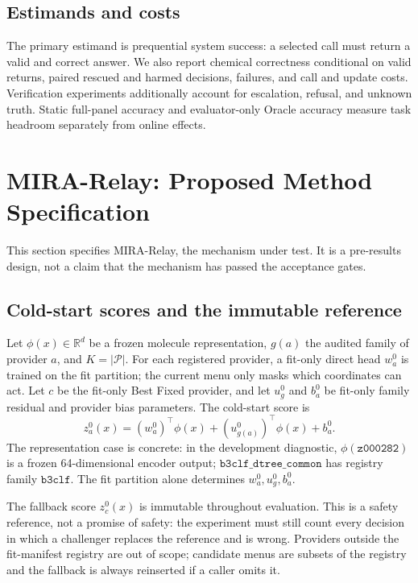 \documentclass[sigconf,anonymous]{aamas}
\begin{document}
\subsection{Estimands and costs}
The primary estimand is prequential system success: a selected call must return a valid and correct answer. We also report chemical correctness conditional on valid returns, paired rescued and harmed decisions, failures, and call and update costs. Verification experiments additionally account for escalation, refusal, and unknown truth. Static full-panel accuracy and evaluator-only Oracle accuracy measure task headroom separately from online effects.

\section{MIRA-Relay: Proposed Method Specification}
This section specifies MIRA-Relay, the mechanism under test. It is a pre-results design, not a claim that the mechanism has passed the acceptance gates.

\subsection{Cold-start scores and the immutable reference}
Let $\phi(x)\in\mathbb{R}^{d}$ be a frozen molecule representation, $g(a)$ the audited family of provider $a$, and $K=|\mathcal P|$. For each registered provider, a fit-only direct head $w_a^0$ is trained on the fit partition; the current menu only masks which coordinates can act. Let $c$ be the fit-only Best Fixed provider, and let $u_g^0$ and $b_a^0$ be fit-only family residual and provider bias parameters. The cold-start score is
$$
z_a^0(x)=(w_a^0)^\top\phi(x)+(u_{g(a)}^0)^\top\phi(x)+b_a^0.
$$
The representation case is concrete: in the development diagnostic, $\phi(\texttt{z000282})$ is a frozen 64-dimensional encoder output; $\texttt{b3clf\_dtree\_common}$ has registry family $\texttt{b3clf}$. The fit partition alone determines $w_a^0,u_g^0,b_a^0$.

The fallback score $z_c^0(x)$ is immutable throughout evaluation. This is a safety reference, not a promise of safety: the experiment must still count every decision in which a challenger replaces the reference and is wrong. Providers outside the fit-manifest registry are out of scope; candidate menus are subsets of the registry and the fallback is always reinserted if a caller omits it.
\end{document}
